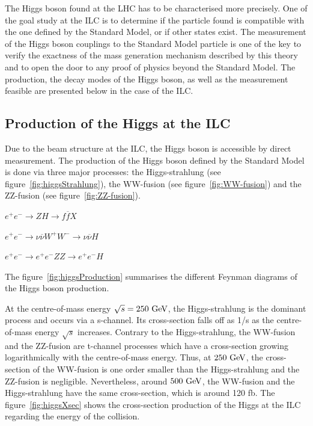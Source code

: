  The Higgs boson found at the \gls{LHC} has to be characterised more precisely.
  One of the goal study at the \gls{ILC} is to determine if the particle found is compatible with the one defined by the Standard Model, or if other states exist.
  The measurement of the Higgs boson couplings to the Standard Model particle is one of the key to verify the exactness of the mass generation mechanism described by this theory and to open the door to any proof of physics beyond the Standard Model.
  The production, the decay modes of the Higgs boson, as well as the measurement feasible are presented below in the case of the \gls{ILC}.


    \subsection{Production of the Higgs at the ILC}

    Due to the beam structure at the \gls{ILC}, the Higgs boson is accessible by direct measurement.
    The production of the Higgs boson defined by the Standard Model is done via three major processes: the Higgs-strahlung (see figure~\ref{fig:higgsStrahlung}), the WW-fusion (see figure~\ref{fig:WW-fusion}) and the ZZ-fusion (see figure~\ref{fig:ZZ-fusion}).

    \begin{description}
      \centering
      \item[Higgs-strahlung:] $e^+e^- \rightarrow ZH \rightarrow f\overline{f}X$
      \item[WW-fusion:] $e^+e^- \rightarrow \nu \overline{\nu} W^+W^- \rightarrow \nu \overline{\nu} H$
      \item[ZZ-fusion:] $e^+e^- \rightarrow e^+e^- ZZ \rightarrow e^+e^- H$
    \end{description}

    The figure~\ref{fig:higgsProduction} summarises the different Feynman diagrams of the Higgs boson production.

    At the centre-of-mass energy $\sqrt{s} = 250~\rm{GeV}$, the Higgs-strahlung is the dominant process and occurs via a s-channel. 
    Its cross-section falls off as 1/s as the centre-of-mass energy $\sqrt{s}$ increases.
    Contrary to the Higgs-strahlung, the WW-fusion and the ZZ-fusion are t-channel processes which have a cross-section growing logarithmically with the centre-of-mass energy.
    Thus, at $250~\rm{GeV}$, the cross-section of the WW-fusion is one order smaller than the Higgs-strahlung and the ZZ-fusion is negligible.
    Nevertheless, around $500~\rm{GeV}$, the WW-fusion and the Higgs-strahlung have the same cross-section, which is around 120 fb.
    The figure~\ref{fig:higgsXsec} shows the cross-section production of the Higgs at the ILC regarding the energy of the collision.
    
